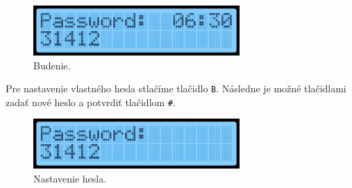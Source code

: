 \vspace{5mm}
\begin{figure}[h]
    \centering
    \includegraphics[width=0.7\textwidth]{img/display_alarm.png}
    \caption{Budenie.}
\end{figure}

Pre nastavenie vlastného hesla stlačíme tlačidlo \texttt{B}. Následne je možné tlačidlami zadať nové heslo a potvrdiť tlačidlom \texttt{\#}.

\vspace{5mm}
\begin{figure}[h]
    \centering
    \includegraphics[width=0.7\textwidth]{img/display_set_pass.png}
    \caption{Nastavenie hesla.}
\end{figure}
